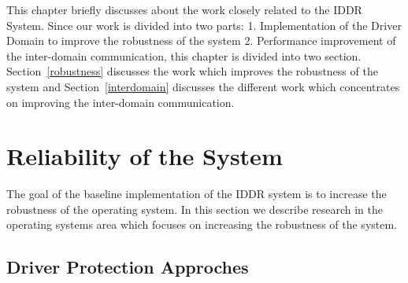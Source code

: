
This chapter briefly discusses about the work closely related to the IDDR System. Since our work is divided into two parts: 1. Implementation of the Driver Domain to improve the robustness of the system 2. Performance improvement of the inter-domain communication, this chapter is divided into two section. Section~\ref{robustness} discusses the work which improves the robustness of the system and Section~\ref{interdomain} discusses the different work which concentrates on improving the inter-domain communication.
\\[3mm]

\section{Reliability of the System}

The goal of the baseline implementation of the IDDR system is to increase the robustness of the operating system. In this section we describe research in the operating systems area which focuses on increasing the robustness of the system.

\subsection{Driver Protection Approches}

